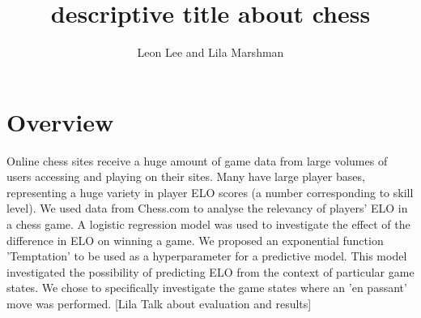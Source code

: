 \documentclass[10pt,a4paper,twocolumn]{article}
\title{descriptive title about chess}
\author{Leon Lee and Lila Marshman}
\begin{document}
\maketitle


\section{Overview}


Online chess sites receive a huge amount of game data from large volumes of users accessing and playing on their sites. Many have large player bases, representing a huge variety in player ELO scores (a number corresponding to skill level). We used data from Chess.com to analyse the relevancy of players' ELO in a chess game. A logistic regression model was used to investigate the effect of the difference in ELO on winning a game. We proposed an exponential function 'Temptation' to be used as a hyperparameter for a predictive model. This model investigated the possibility of predicting ELO from the context of particular game states. We chose to specifically investigate the game states where an 'en passant' move was performed. [Lila Talk about evaluation and results]
\end{document}

